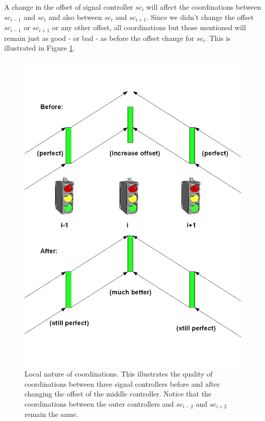 A change in the offset of signal controller $sc_i$ will affect the coordinations between $sc_{i-1}$ and $sc_{i}$ and also between $sc_{i}$ and $sc_{i+1}$. Since we didn't change the offset $sc_{i-1}$ or $sc_{i+1}$ or any other offset, all coordinations but those mentioned will remain just as good - or bad - as before the offset change for $sc_i$. This is illustrated in Figure \ref{fig:delta_eval}.

\begin{figure}[ht]
\centering
\includegraphics[scale=0.3]{delta_eval.png}
\caption{Local nature of coordinations. This illustrates the quality of coordinations between three signal controllers before and after changing the offset of the middle controller. Notice that the coordinations between the outer controllers and $sc_{i-2}$ and $sc_{i+2}$ remain the same.}
\label{fig:delta_eval}
\end{figure}

